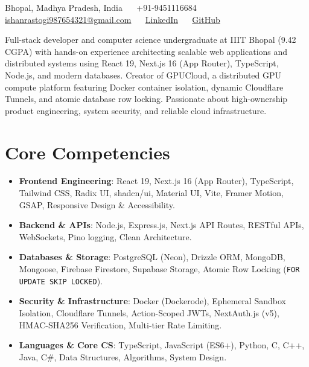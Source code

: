 \documentclass[11pt,a4paper,sans]{moderncv}
\makeatletter
\renewcommand*{\namefont}{\fontsize{34}{36}\bfseries\upshape}
\renewcommand*{\makecvtitle}{%
  \begin{center}%
    {\namefont{\color{color1}Ishan Rastogi}}\par\vspace{3pt}%
    {\small%
      Bhopal, Madhya Pradesh, India%
      \ \textbar\ %
      +91-9451116684%
      \ \textbar\ %
      \href{mailto:ishanrastogi987654321@gmail.com}{ishanrastogi987654321@gmail.com}%
      \ \textbar\ %
      \href{https://linkedin.com/in/ishan-rastogi-303550225}{LinkedIn}%
      \ \textbar\ %
      \href{https://github.com/ishanrastogi98}{GitHub}%
    }\par\vspace{4pt}%
  \end{center}%
}
\makeatother
\begin{document}
\makecvtitle


\vspace{6pt}
\small{Full-stack developer and computer science undergraduate at IIIT Bhopal (9.42 CGPA) with hands-on experience architecting scalable web applications and distributed systems using React 19, Next.js 16 (App Router), TypeScript, Node.js, and modern databases. Creator of GPUCloud, a distributed GPU compute platform featuring Docker container isolation, dynamic Cloudflare Tunnels, and atomic database row locking. Passionate about high-ownership product engineering, system security, and reliable cloud infrastructure.}


\section{Core Competencies}
\vspace{1pt}
\begin{itemize}

\item \textbf{Frontend Engineering}: React 19, Next.js 16 (App Router), TypeScript, Tailwind CSS, Radix UI, shadcn/ui, Material UI, Vite, Framer Motion, GSAP, Responsive Design \& Accessibility.

\item \textbf{Backend \& APIs}: Node.js, Express.js, Next.js API Routes, RESTful APIs, WebSockets, Pino logging, Clean Architecture.

\item \textbf{Databases \& Storage}: PostgreSQL (Neon), Drizzle ORM, MongoDB, Mongoose, Firebase Firestore, Supabase Storage, Atomic Row Locking (\texttt{FOR UPDATE SKIP LOCKED}).

\item \textbf{Security \& Infrastructure}: Docker (Dockerode), Ephemeral Sandbox Isolation, Cloudflare Tunnels, Action-Scoped JWTs, NextAuth.js (v5), HMAC-SHA256 Verification, Multi-tier Rate Limiting.

\item \textbf{Languages \& Core CS}: TypeScript, JavaScript (ES6+), Python, C, C++, Java, C\#, Data Structures, Algorithms, System Design.

\end{itemize}
\end{document}
